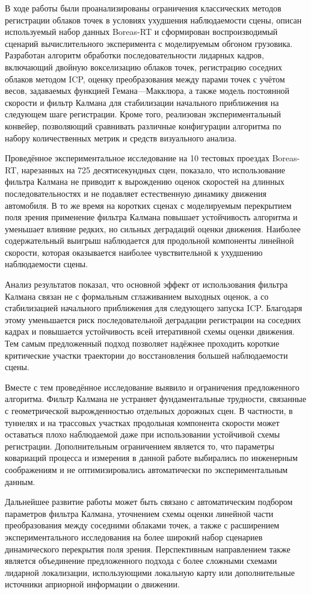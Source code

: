 \conclusion

В ходе работы были проанализированы ограничения классических методов регистрации облаков точек в условиях ухудшения наблюдаемости сцены, описан используемый набор данных Boreas-RT и сформирован воспроизводимый сценарий вычислительного эксперимента с моделируемым обгоном грузовика. Разработан алгоритм обработки последовательности лидарных кадров, включающий двойную вокселизацию облаков точек, регистрацию соседних облаков методом ICP, оценку преобразования между парами точек с учётом весов, задаваемых функцией Гемана---Макклюра, а также модель постоянной скорости и фильтр Калмана для стабилизации начального приближения на следующем шаге регистрации. Кроме того, реализован экспериментальный конвейер, позволяющий сравнивать различные конфигурации алгоритма по набору количественных метрик и средств визуального анализа.

Проведённое экспериментальное исследование на 10 тестовых проездах Boreas-RT, нарезанных на 725 десятисекундных сцен, показало, что использование фильтра Калмана не приводит к вырождению оценок скоростей на длинных последовательностях и не подавляет естественную динамику движения автомобиля. В то же время на коротких сценах с моделируемым перекрытием поля зрения применение фильтра Калмана повышает устойчивость алгоритма и уменьшает влияние редких, но сильных деградаций оценки движения. Наиболее содержательный выигрыш наблюдается для продольной компоненты линейной скорости, которая оказывается наиболее чувствительной к ухудшению наблюдаемости сцены.

Анализ результатов показал, что основной эффект от использования фильтра Калмана связан не с формальным сглаживанием выходных оценок, а со стабилизацией начального приближения для следующего запуска ICP. Благодаря этому уменьшается риск последовательной деградации регистрации на соседних кадрах и повышается устойчивость всей итеративной схемы оценки движения. Тем самым предложенный подход позволяет надёжнее проходить короткие критические участки траектории до восстановления большей наблюдаемости сцены.

Вместе с тем проведённое исследование выявило и ограничения предложенного алгоритма. Фильтр Калмана не устраняет фундаментальные трудности, связанные с геометрической вырожденностью отдельных дорожных сцен. В частности, в туннелях и на трассовых участках продольная компонента скорости может оставаться плохо наблюдаемой даже при использовании устойчивой схемы регистрации. Дополнительным ограничением является то, что параметры ковариаций процесса и измерения в данной работе выбирались по инженерным соображениям и не оптимизировались автоматически по экспериментальным данным.

Дальнейшее развитие работы может быть связано с автоматическим подбором параметров фильтра Калмана, уточнением схемы оценки линейной части преобразования между соседними облаками точек, а также с расширением экспериментального исследования на более широкий набор сценариев динамического перекрытия поля зрения. Перспективным направлением также является объединение предложенного подхода с более сложными схемами лидарной локализации, использующими локальную карту или дополнительные источники априорной информации о движении.
